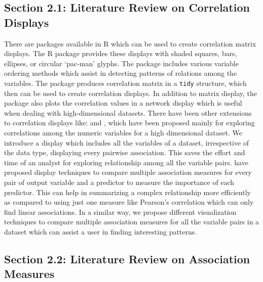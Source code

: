 \hypertarget{section-2.1-literature-review-on-correlation-displays}{%
\subsection{Section 2.1: Literature Review on Correlation
Displays}\label{section-2.1-literature-review-on-correlation-displays}}

There are packages available in R which can be used to create
correlation matrix displays. The R package  provides
these displays with shaded squares, bars, ellipses, or circular
`pac-man' glyphs. The package includes various variable ordering methods
which assist in detecting patterns of relations among the variables. The
package  produces correlation matrix in a \texttt{tidy}
structure, which then can be used to create correlation displays. In
addition to matrix display, the package also plots the correlation
values in a network display which is useful when dealing with
high-dimensional datasets. There have been other extensions to
correlation displays like: \citep{buja2016visualization} and
, which have been proposed mainly for exploring
correlations among the numeric variables for a high dimensional dataset.
We introduce a display which includes all the variables of a dataset,
irrespective of the data type, displaying every pairwise association.
This saves the effort and time of an analyst for exploring relationship
among all the variable pairs. \citet{kuhn2013applied} have proposed
display techniques to compare multiple association measures for every
pair of output variable and a predictor to measure the importance of
each predictor. This can help in summarizing a complex relationship more
efficiently as compared to using just one measure like Pearson's
correlation which can only find linear associations. In a similar way,
we propose different visualization techniques to compare multiple
association measures for all the variable pairs in a dataset which can
assist a user in finding interesting patterns.

\hypertarget{section-2.2-literature-review-on-association-measures}{%
\subsection{Section 2.2: Literature Review on Association
Measures}\label{section-2.2-literature-review-on-association-measures}}

